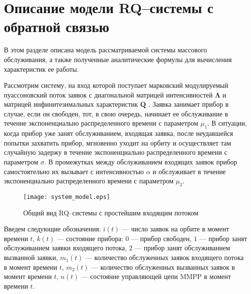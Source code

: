 \section {Описание модели RQ--системы с обратной связью}

В этом разделе описана модель рассматриваемой системы массового обслуживания, а также полученные аналитические формулы для вычисления характеристик ее работы.

Рассмотрим систему, на вход которой поступает марковский модулируемый пуассоновский поток заявок \cite{meier1987fitting,2019asymptotic,baiocchi1993steady} с диагональной матрицей интенсивностей $\boldsymbol{\Lambda}$ и матрицей инфинитезимальных характеристик $\boldsymbol{Q}$ \cite{yang2013map}. Заявка занимает прибор в случае, если он свободен, тот, в свою очередь, начинает ее обслуживание в течение экспоненциально распределенного времени с параметром $\mu_{1}$. В ситуации, когда прибор уже занят обслуживанием, входящая заявка, после неудавшейся попытки захватить прибор, мгновенно уходит на орбиту и осуществляет там случайную задержу в течение экспоненциально распределенного времени с параметром $\sigma$. В промежутках между обслуживанием входящих заявок прибор самостоятельно их вызывает с интенсивностью $\alpha$ и обслуживает в течение экспоненциально распределенного времени с параметром $\mu_{2}$.
\begin{figure}[H]
	\centering
	\texttt{[image: system\_model.eps]}
	\caption{Общий вид RQ--системы с простейшим входящим потоком}
	\label{common_model_fig}
\end{figure}
Введем следующие обозначения: $i(t)$ --- число заявок на орбите в момент времени $t$, $k(t)$ --- состояние прибора: $0$ --- прибор свободен, $1$ --- прибор занят обслуживанием заявки входящего потока, $2$ --- прибор занят обслуживанием вызванной заявки, $m_1(t)$ --- количество обслуженных заявок входящего потока в момент времени $t$, $m_2(t)$ --- количество обслуженных вызванных заявок в момент времени $t$, $n(t)$ --- состояние управляющей цепи MMPP в момент времени $t$.

